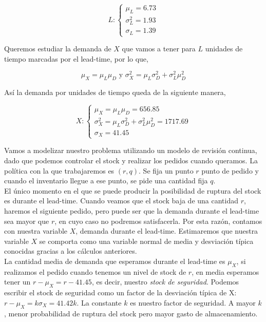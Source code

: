 \documentclass[a4paper,12pt]{article}
\begin{document}
	\begin{equation*}
	L:  \left\lbrace \begin{array}{l}
		\mu_L = 6.73\\
		\sigma_L^2 = 1.93\\
		\sigma_L = 1.39
	\end{array}
	\right. 
	\end{equation*}

Queremos estudiar la demanda de $X$ que vamos a tener para $L$ unidades de tiempo marcadas por el lead-time, por lo que,

$$\mu_X = \mu_L \mu_D \text{ y } \sigma_X^2 = \mu_L \sigma_D^2 + \sigma_L^2 \mu_D^2$$

As\'i la demanda por unidades de tiempo queda de la siguiente manera,


	\begin{equation*}
	X:  \left\lbrace \begin{array}{l}
		\mu_X = \mu_L \mu_D = 656.85\\
		\sigma_X^2 = \mu_L \sigma_D^2 + \sigma_L^2 \mu_D^2 = 1717.69\\
		\sigma_X = 41.45
	\end{array}
	\right. 
	\end{equation*}

Vamos a modelizar nuestro problema utilizando un modelo de revisi\'on continua, dado que podemos controlar el stock y realizar los pedidos cuando queramos. La pol\'itica con la que trabajaremos es $(r, q)$. Se fija un punto $r$ punto de pedido y cuando el inventario llegue a ese punto, se pide una cantidad fija $q$. \\

El \'unico momento en el que se puede producir la posibilidad de ruptura del stock es durante el lead-time. Cuando veamos que el stock baja de una cantidad $r$, haremos el siguiente pedido, pero puede ser que la demanda durante el lead-time sea mayor que $r$, en cuyo caso no podremos satisfacerla. Por esta raz\'on, contamos con nuestra variable $X$, demanda durante el lead-time. Estimaremos que nuestra variable $X$ se comporta como una variable normal de media y desviaci\'on t\'ipica conocidas gracias a los c\'alculos anteriores.\\

La cantidad media de demanda que esperamos durante el lead-time es $\mu_X$, si realizamos el pedido cuando tenemos un nivel de stock de $r$, en media esperamos tener un $r - \mu_X = r - 41.45$, es decir, nuestro \textit{stock de seguridad}. Podemos escribir el stock de seguridad como un factor de la desviaci\'on t\'ipica de X: $r - \mu_X = k\sigma_X =  41.42 k$. La constante $k$ es nuestro factor de seguridad. A mayor $k$, menor probabilidad de ruptura del stock pero mayor gasto de almacenamiento. \\
\end{document}
